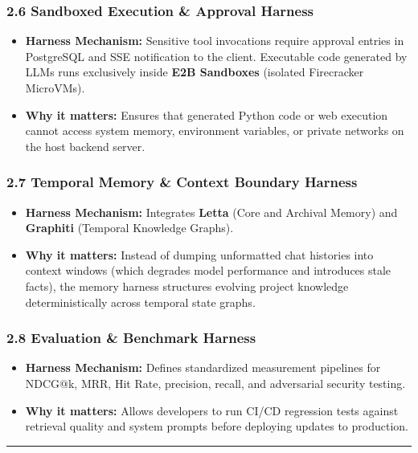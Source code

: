 \documentclass{article}
\begin{document}
\subsubsection{2.6 Sandboxed Execution \& Approval Harness}
\begin{itemize}
    \item \textbf{Harness Mechanism:} Sensitive tool invocations require approval entries in PostgreSQL and SSE notification to the client. Executable code generated by LLMs runs exclusively inside \textbf{E2B Sandboxes} (isolated Firecracker MicroVMs).
    \item \textbf{Why it matters:} Ensures that generated Python code or web execution cannot access system memory, environment variables, or private networks on the host backend server.
\end{itemize}

\subsubsection{2.7 Temporal Memory \& Context Boundary Harness}
\begin{itemize}
    \item \textbf{Harness Mechanism:} Integrates \textbf{Letta} (Core and Archival Memory) and \textbf{Graphiti} (Temporal Knowledge Graphs).
    \item \textbf{Why it matters:} Instead of dumping unformatted chat histories into context windows (which degrades model performance and introduces stale facts), the memory harness structures evolving project knowledge deterministically across temporal state graphs.
\end{itemize}

\subsubsection{2.8 Evaluation \& Benchmark Harness}
\begin{itemize}
    \item \textbf{Harness Mechanism:} Defines standardized measurement pipelines for NDCG@k, MRR, Hit Rate, precision, recall, and adversarial security testing.
    \item \textbf{Why it matters:} Allows developers to run CI/CD regression tests against retrieval quality and system prompts before deploying updates to production.
\end{itemize}

\hrule
\vspace{0.5cm}
\end{document}
